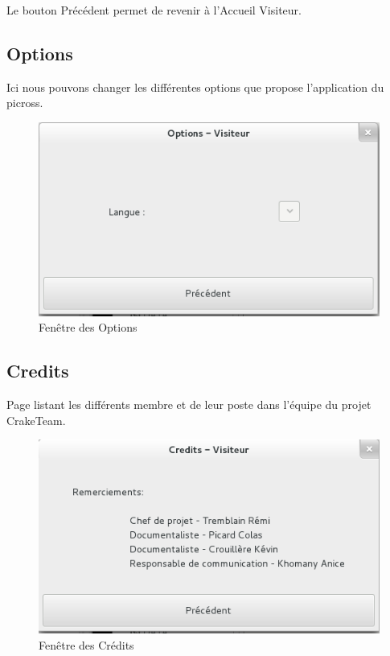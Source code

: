 \documentclass[11pt]{article}
\begin{document}
Le bouton Précédent permet de revenir à l'Accueil Visiteur.	

\subsection{Options}

Ici nous pouvons changer les différentes options que propose l'application du picross.

	\begin{figure}[!ht]
		\centering
		\includegraphics{./Screenshot/Options.png}
		\caption{Fenêtre des Options}
	\end{figure}


\subsection{Credits}

Page listant les différents membre et de leur poste dans l'équipe du projet CrakeTeam.

	\begin{figure}[!ht]
		\centering
		\includegraphics{./Screenshot/Credits.png}
		\caption{Fenêtre des Crédits}
	\end{figure}
\end{document}
